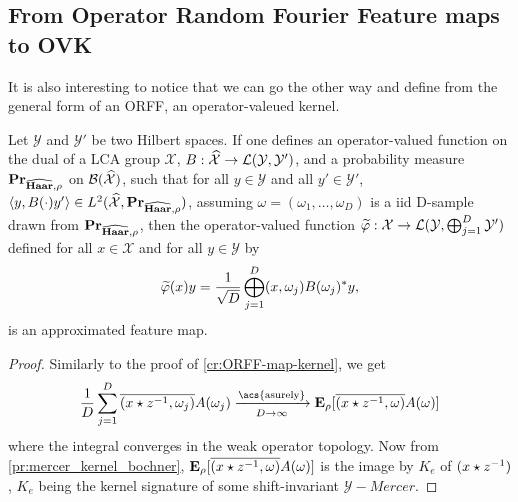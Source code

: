 \subsection{From Operator Random Fourier Feature maps to OVK}
It is also interesting to notice that we can go the other way and define from
the general form of an \acl{ORFF}, an operator-valeued kernel.
\begin{proposition}
    \label{pr:ORFF-map} Let $\mathcal{Y}$ and $\mathcal{Y}'$ be two Hilbert
    spaces. If one defines an operator-valued function on the dual of a LCA
    group $\mathcal{X}$, $B: \widehat{\mathcal{X}} \to
    \mathcal{L}(\mathcal{Y},\mathcal{Y}')$, and a probability measure
    ${\mathbf{{Pr}}}_{\widehat{\mathbf{Haar}},\rho}$ on $\mathcal{B}(\widehat{\mathcal{X}})$,
    such that for all $y\in\mathcal{Y}$ and all $y'\in\mathcal{Y}'$, $\langle y,
    B(\cdot)y'\rangle \in L^2(\widehat{\mathcal{X}}, {\mathbf{{Pr}}}_{\widehat{\mathbf{Haar}},\rho})$,
    assuming $\omega = (\omega_1, \ldots, \omega_D)$ is a \acs{iid} D-sample
    drawn from ${\mathbf{{Pr}}}_{\widehat{\mathbf{Haar}},\rho}$, then the operator-valued
    function $\tildePhi{\omega}: \mathcal{X} \to   \mathcal{L}(\mathcal{Y},
    \vect_{j=1}^D\mathcal{Y}')$ defined for all $x \in \mathcal{X}$ and for all
    $y\in\mathcal{Y}$ by
    \begin{dmath}
        \label{eq:phitilde}
        \tildePhi{\omega}(x)y
        = \frac{1}{\sqrt{D}}\Vect_{j=1}^D\pairing{x,
        \omega_j}B(\omega_j)^\adjoint y,
    \end{dmath}
    is an approximated feature map.
\end{proposition}
\begin{proof}
    Similarly to the proof of \cref{cr:ORFF-map-kernel}, we get
    \begin{dmath*}
        \frac{1}{D} \sum_{j=1}^D
        \conj{\pairing{x\groupop\inv{z},\omega_j}} A(\omega_j)
        \converges{\acs{asurely}}{D \to \infty}
        \expectation_{\rho}[\conj{\pairing{x \groupop
        z^{-1}, \omega} }A(\omega)]
    \end{dmath*}
    where the integral converges in the weak operator topology.  Now  from
    \cref{pr:mercer_kernel_bochner}, ${\mathbf{{E}}}_{\rho}[\overline{(x
    \star z^{-1}, \omega) }A(\omega)]$ is the image by $K_e$ of
    $(x\star{z}^{-1})$, $K_e$ being the kernel signature of some
    shift-invariant $\mathcal{Y}-Mercer$.
\end{proof}

